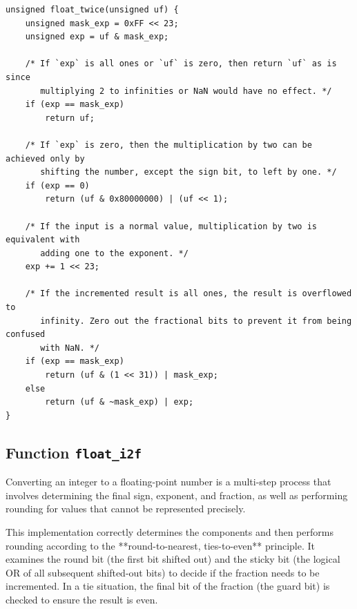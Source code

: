 \documentclass{article}
\begin{document}
\begin{verbatim}
unsigned float_twice(unsigned uf) {
    unsigned mask_exp = 0xFF << 23;
    unsigned exp = uf & mask_exp;

    /* If `exp` is all ones or `uf` is zero, then return `uf` as is since
       multiplying 2 to infinities or NaN would have no effect. */
    if (exp == mask_exp)
        return uf;

    /* If `exp` is zero, then the multiplication by two can be achieved only by
       shifting the number, except the sign bit, to left by one. */
    if (exp == 0)
        return (uf & 0x80000000) | (uf << 1);

    /* If the input is a normal value, multiplication by two is equivalent with
       adding one to the exponent. */
    exp += 1 << 23;

    /* If the incremented result is all ones, the result is overflowed to
       infinity. Zero out the fractional bits to prevent it from being confused
       with NaN. */
    if (exp == mask_exp)
        return (uf & (1 << 31)) | mask_exp;
    else
        return (uf & ~mask_exp) | exp;
}
\end{verbatim}

\subsection{Function \texttt{float\_i2f}}

Converting an integer to a floating-point number is a multi-step process that 
involves determining the final sign, exponent, and fraction, as well as 
performing rounding for values that cannot be represented precisely.

This implementation correctly determines the components and then performs 
rounding according to the **round-to-nearest, ties-to-even** principle. It 
examines the round bit (the first bit shifted out) and the sticky bit 
(the logical OR of all subsequent shifted-out bits) to decide if the fraction 
needs to be incremented. In a tie situation, the final bit of the fraction 
(the guard bit) is checked to ensure the result is even.
\end{document}
